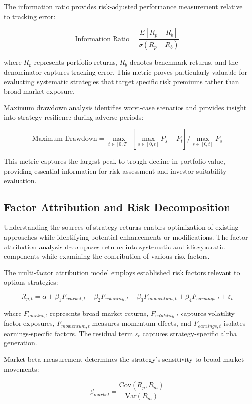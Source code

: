\documentclass[
  american,
  11pt,
  11pt,
  letterpaper,
  onecolumn]{article}
\begin{document}
The information ratio provides risk-adjusted performance measurement
relative to tracking error:

\[\text{Information Ratio} = \frac{E[R_p - R_b]}{\sigma(R_p - R_b)}\]

where \(R_p\) represents portfolio returns, \(R_b\) denotes benchmark
returns, and the denominator captures tracking error. This metric proves
particularly valuable for evaluating systematic strategies that target
specific risk premiums rather than broad market exposure.

Maximum drawdown analysis identifies worst-case scenarios and provides
insight into strategy resilience during adverse periods:

\[\text{Maximum Drawdown} = \max_{t \in [0,T]} \left[\max_{s \in [0,t]} P_s - P_t\right] / \max_{s \in [0,t]} P_s\]

This metric captures the largest peak-to-trough decline in portfolio
value, providing essential information for risk assessment and investor
suitability evaluation.

\subsection{Factor Attribution and Risk
Decomposition}\label{factor-attribution-and-risk-decomposition}

Understanding the sources of strategy returns enables optimization of
existing approaches while identifying potential enhancements or
modifications. The factor attribution analysis decomposes returns into
systematic and idiosyncratic components while examining the contribution
of various risk factors.

The multi-factor attribution model employs established risk factors
relevant to options strategies:

\[R_{p,t} = \alpha + \beta_1 F_{market,t} + \beta_2 F_{volatility,t} + \beta_3 F_{momentum,t} + \beta_4 F_{earnings,t} + \varepsilon_t\]

where \(F_{market,t}\) represents broad market returns,
\(F_{volatility,t}\) captures volatility factor exposures,
\(F_{momentum,t}\) measures momentum effects, and \(F_{earnings,t}\)
isolates earnings-specific factors. The residual term \(\varepsilon_t\)
captures strategy-specific alpha generation.

Market beta measurement determines the strategy's sensitivity to broad
market movements:

\[\beta_{market} = \frac{\text{Cov}(R_p, R_m)}{\text{Var}(R_m)}\]
\end{document}

